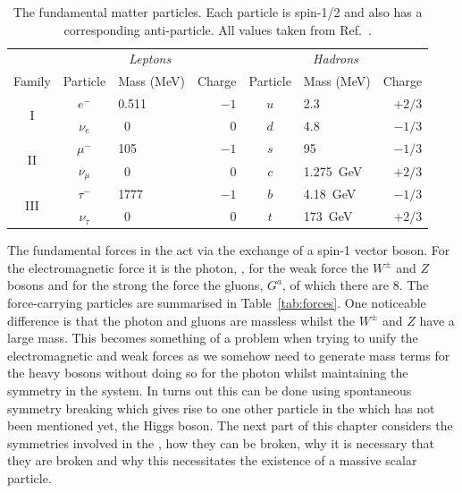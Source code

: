 \begin{table}[htb]
  \begin{tabular}{c | c l r | c l r }
  & \multicolumn{3}{c}{\textit{Leptons}} & \multicolumn{3}{c}{\textit{Hadrons}} \\
  Family & Particle      & Mass (MeV)  & Charge &  Particle      & Mass (MeV)  & Charge   \\
  \hline
  \multirow{2}{*}{I}    & $e^{-}$       & 0.511       & $-1$     &  $u$           & 2.3       & $+2/3$      \\
                        & $\nu_{e}$     & ~0          & 0      &  $d$           & 4.8         & $-1/3$       \\
  \multirow{2}{*}{II}   & $\mu^{-}$     & 105         & $-1$     &  $s$           & 95         & $-1/3$      \\
                        & $\nu_{\mu}$   & ~0          & 0      &  $c$           & 1.275~GeV          & $+2/3$       \\
  \multirow{2}{*}{III}  & $\tau^{-}$    & 1777        & $-1$     &  $b$           & 4.18~GeV        & $-1/3$      \\
                        & $\nu_{\tau}$  & ~0          & 0      &  $t$           & 173~GeV          & $+2/3$      \\
  \end{tabular}
  \caption[The fundamental matter particles]{The fundamental matter particles. Each particle is spin-1/2 and also has a corresponding anti-particle. All values taken from Ref.~\cite{pdg}.}
  \label{tab:particles}
\end{table}

The fundamental forces in the \SM act via the exchange of a spin-1 vector boson. For the electromagnetic force it is the photon, \gamma, for the weak force the $W^{\pm}$ and $Z$ bosons and for the strong the force the gluons, $G^{a}$, of which there are 8. The force-carrying particles are summarised in Table~\ref{tab:forces}. One noticeable difference is that the photon and gluons are massless whilst the $W^{\pm}$ and $Z$ have a large mass. This becomes something of a problem when trying to unify the electromagnetic and weak forces as we somehow need to generate mass terms for the heavy bosons without doing so for the photon whilst maintaining the symmetry in the system. In turns out this can be done using spontaneous symmetry breaking which gives rise to one other particle in the \SM which has not been mentioned yet, the Higgs boson. The next part of this chapter considers the symmetries involved in the \SM, how they can be broken, why it is necessary that they are broken and why this necessitates the existence of a massive scalar particle.

